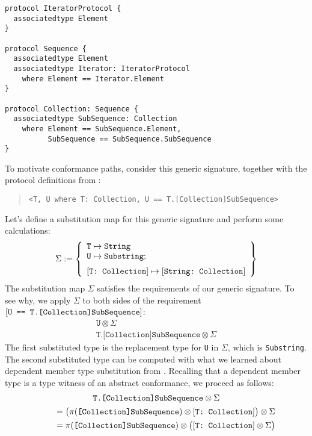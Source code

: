 \documentclass[../generics]{subfiles}
\begin{document}
\begin{listing}\label{conformance paths listing}
\begin{Verbatim}
protocol IteratorProtocol {
  associatedtype Element
}

protocol Sequence {
  associatedtype Element
  associatedtype Iterator: IteratorProtocol
    where Element == Iterator.Element
}

protocol Collection: Sequence {
  associatedtype SubSequence: Collection
    where Element == SubSequence.Element,
          SubSequence == SubSequence.SubSequence
}
\end{Verbatim}
\end{listing}
To motivate conformance paths, consider this generic signature, together with the protocol definitions from :
\begin{quote}
\begin{verbatim}
<T, U where T: Collection, U == T.[Collection]SubSequence>
\end{verbatim}
\end{quote}
Let's define a substitution map for this generic signature and perform some calculations:
\[
\Sigma := \SubstMapLongC{
\SubstType{T}{String}\\
\SubstType{U}{Substring}
}{
\SubstConf{T}{String}{Collection}
}
\]
The substitution map $\Sigma$ satisfies the requirements of our generic signature. To see why, we apply $\Sigma$ to both sides of the requirement $[\texttt{U == T.[Collection]SubSequence}]$:
\begin{gather*}
\texttt{U} \otimes \Sigma\\
\texttt{T.[Collection]SubSequence} \otimes \Sigma
\end{gather*}
The first substituted type is the replacement type for \texttt{U} in $\Sigma$, which is \texttt{Substring}. The second substituted type can be computed with what we learned about dependent member type substitution from . Recalling that a dependent member type is a type witness of an abstract conformance, we proceed as follows:
\begin{gather*}
\texttt{T.[Collection]SubSequence} \otimes \Sigma\\
\qquad {} = \bigl(\pi(\texttt{[Collection]SubSequence}) \otimes [\texttt{T:~Collection}]\bigr) \otimes \Sigma\\
\qquad {} = \pi(\texttt{[Collection]SubSequence}) \otimes \bigl([\texttt{T:~Collection}] \otimes \Sigma\bigr)
\end{gather*}
\end{document}
